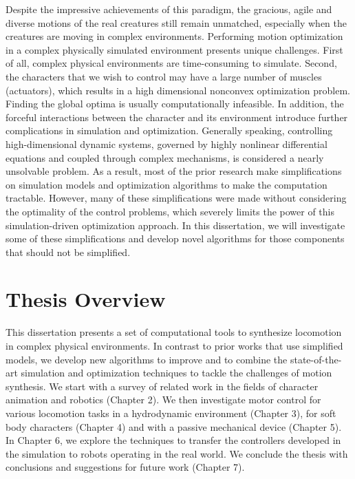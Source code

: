 Despite the impressive achievements of this paradigm, the gracious, agile and diverse motions of the real creatures still remain unmatched, especially when the creatures are moving in complex environments. Performing motion optimization in a complex physically simulated environment presents unique challenges. First of all, complex physical environments are time-consuming to simulate. Second, the characters that we wish to control may have a large number of muscles (actuators), which results in a high dimensional nonconvex optimization problem. Finding the global optima is usually computationally infeasible. In addition, the forceful interactions between the character and its environment introduce further complications in simulation and optimization. Generally speaking, controlling high-dimensional dynamic systems, governed by highly nonlinear differential equations and coupled through complex mechanisms, is considered a nearly unsolvable problem. As a result, most of the prior research make simplifications on simulation models and optimization algorithms to make the computation tractable. However, many of these simplifications were made without considering the optimality of the control problems, which severely limits the power of this simulation-driven optimization approach. In this dissertation, we will investigate some of these simplifications and develop novel algorithms for those components that should not be simplified. 


\section{Thesis Overview}

This dissertation presents a set of computational tools to synthesize locomotion in complex physical environments. In contrast to prior works that use simplified models, we develop new algorithms to improve and to combine the state-of-the-art simulation and optimization techniques to tackle the challenges of motion synthesis. We start with a survey of related work in the fields of character animation and robotics (Chapter 2). We then investigate motor control for various locomotion tasks in a hydrodynamic environment (Chapter 3), for soft body characters (Chapter 4) and with a passive mechanical device (Chapter 5). In Chapter 6, we explore the techniques to transfer the controllers developed in the simulation to robots operating in the real world. We conclude the thesis with conclusions and suggestions for future work (Chapter 7).

